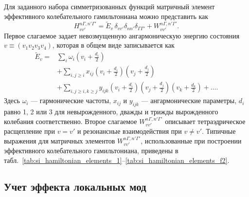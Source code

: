 Для заданного набора симметризованных функций матричный элемент эффективного колебательного
гамильтониана можно представить как
\begin{equation}
H_{vv'}^{n\Gamma,n'\Gamma'} = \widetilde{E}_{v}\,\delta_{vv'}\delta_{nn'}\delta_{\Gamma\Gamma'}
+ W_{vv'}^{n\Gamma,n'\Gamma'} .
\label{eq:si_hamiltonian_matrix}
\end{equation}
Первое слагаемое задает невозмущенную ангармоническую энергию состояния $v\equiv(v_1v_2v_3v_4)$,
которая в общем виде записывается как
\begin{equation}
\begin{aligned}
\widetilde{E}_{v} ={}&
\sum_i \omega_i\left(v_i+\frac{d_i}{2}\right) \\
&+\sum_{i,j\geq i} x_{ij}
\left(v_i+\frac{d_i}{2}\right)
\left(v_j+\frac{d_j}{2}\right) \\
&+\sum_{i,j\geq i,k\geq j} y_{ijk}
\left(v_i+\frac{d_i}{2}\right)
\left(v_j+\frac{d_j}{2}\right)
\left(v_k+\frac{d_k}{2}\right)
+\ldots .
\end{aligned}
\label{eq:si_unperturbed_energy}
\end{equation}
Здесь $\omega_i$ --- гармонические частоты, $x_{ij}$ и $y_{ijk}$ --- ангармонические параметры,
$d_i$ равно 1, 2 или 3 для невырожденного, дважды и трижды вырожденного колебания соответственно.
Второе слагаемое $W_{vv'}^{n\Gamma,n'\Gamma'}$ описывает тетраэдрическое расщепление при $v=v'$ и
резонансные взаимодействия при $v\neq v'$. Типичные выражения для матричных элементов $W_{vv'}^{n\Gamma,n'\Gamma'}$,
использованные при построении эффективного колебательного гамильтониана,
приведены в табл.~\ref{tab:si_hamiltonian_elements_1}--\ref{tab:si_hamiltonian_elements_f2}.

\afterpage{%







}

\subsection{Учет эффекта локальных мод}

